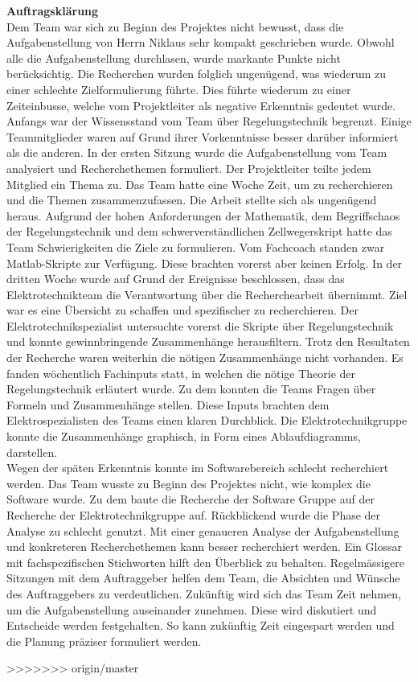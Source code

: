 \textbf{Auftragsklärung}\\
Dem Team war sich zu Beginn des Projektes nicht bewusst, dass die Aufgabenstellung von Herrn Niklaus sehr kompakt geschrieben wurde. Obwohl alle die Aufgabenstellung durchlasen, wurde markante Punkte nicht berücksichtig. Die Recherchen wurden folglich ungenügend, was wiederum zu einer schlechte Zielformulierung führte. Dies führte wiederum zu einer Zeiteinbusse, welche vom Projektleiter als negative Erkenntnis gedeutet wurde.\\ 
Anfangs war der Wissensstand vom Team über Regelungstechnik begrenzt. Einige Teammitglieder waren auf Grund ihrer Vorkenntnisse besser darüber informiert als die anderen. In der ersten Sitzung wurde die Aufgabenstellung vom Team analysiert und Recherchethemen formuliert. Der Projektleiter teilte jedem Mitglied ein Thema zu. Das Team hatte eine Woche Zeit, um zu recherchieren und die Themen zusammenzufassen. Die Arbeit stellte sich als ungenügend heraus. Aufgrund der hohen Anforderungen der Mathematik, dem Begriffschaos der Regelungstechnik und dem schwerverständlichen Zellwegerskript hatte das Team Schwierigkeiten die Ziele zu formulieren. Vom Fachcoach standen zwar Matlab-Skripte zur Verfügung. Diese brachten vorerst aber keinen Erfolg. In der dritten Woche wurde auf Grund der Ereignisse beschlossen, dass das Elektrotechnikteam die Verantwortung über die Recherchearbeit übernimmt. Ziel war es eine Übersicht zu schaffen und spezifischer zu recherchieren. Der Elektrotechnikspezialist untersuchte vorerst die Skripte über Regelungstechnik und konnte gewinnbringende Zusammenhänge herausfiltern. Trotz den Resultaten der Recherche waren weiterhin die nötigen Zusammenhänge nicht vorhanden. Es fanden wöchentlich Fachinputs statt, in welchen die nötige Theorie der Regelungstechnik erläutert wurde. Zu dem konnten die Teams Fragen über Formeln und Zusammenhänge stellen. Diese Inputs brachten dem Elektrospezialisten des Teams einen klaren Durchblick. Die Elektrotechnikgruppe konnte die Zusammenhänge graphisch, in Form eines Ablaufdiagramms, darstellen.\\
Wegen der späten Erkenntnis konnte im Softwarebereich schlecht recherchiert werden. Das Team wusste zu Beginn des Projektes nicht, wie komplex die Software wurde. Zu dem baute die Recherche der Software Gruppe auf der Recherche der Elektrotechnikgruppe auf. 
Rückblickend wurde die Phase der Analyse zu schlecht genutzt. Mit einer genaueren Analyse der Aufgabenstellung und konkreteren Recherchethemen kann besser recherchiert werden. Ein Glossar mit fachspezifischen Stichworten hilft den Überblick zu behalten. Regelmässigere Sitzungen mit dem Auftraggeber helfen dem Team, die Absichten und Wünsche des Auftraggebers zu verdeutlichen.
Zukünftig wird sich das Team Zeit nehmen, um die Aufgabenstellung auseinander zunehmen. Diese wird diskutiert und Entscheide werden festgehalten. So kann zukünftig Zeit eingespart werden und die Planung präziser formuliert werden.

>>>>>>> origin/master
